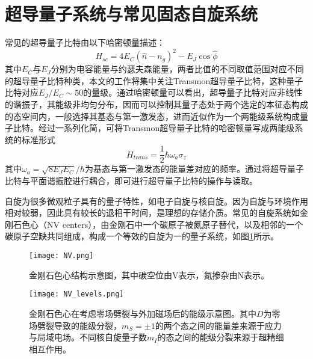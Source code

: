         \section{超导量子系统与常见固态自旋系统} %
        \label{sec:qubit_and_spin}

            常见的超导量子比特由以下哈密顿量描述：
            \begin{equation}
                H_{sc} = 4 E_C (\hat n - n_g)^2 -E_J \cos \hat \phi
            \end{equation}
            其中$ E_C $与$E_J$分别为电容能量与约瑟夫森能量，两者比值的不同取值范围对应不同的超导量子比特种类，本文的工作将集中关注Transmon超导量子比特，这种量子比特对应$E_J/E_C\sim 50$的量级\cite{koch2007charge}。通过哈密顿量可以看出，超导量子比特对应非线性的谐振子，其能级非均匀分布，因而可以控制其量子态处于两个选定的本征态构成的态空间内，一般选择其基态与第一激发态，进而近似作为一个两能级系统构成量子比特。经过一系列化简，可将Transmon超导量子比特的哈密顿量写成两能级系统的标准形式
            \begin{equation}
                H_{trans} = \frac{1}{2}\hbar \omega_a \sigma_z 
            \end{equation}
            其中$ \omega_a = \sqrt{8E_JE_C}/\hbar $为基态与第一激发态的能量差对应的频率。通过将超导量子比特与平面谐振腔进行耦合，即可进行超导量子比特的操作与读取。

            自旋为很多微观粒子具有的量子特性，如电子自旋与核自旋。因为自旋与环境作用相对较弱，因此具有较长的退相干时间，是理想的存储介质。常见的自旋系统如金刚石色心（NV centers），由金刚石中一个碳原子被氮原子替代，以及相邻的一个碳原子空缺共同组成，构成一个等效的自旋为一的量子系统，如图\ref{fig:NV_centers}所示。

            \begin{figure}[h]
                \centering
                \texttt{[image: NV.png]}
                \caption{金刚石色心结构示意图，其中碳空位由V表示，氮掺杂由N表示\cite{grezes2016towards}。}
                \label{fig:NV_centers}
            \end{figure}%

            \begin{figure}[h]
                \centering
                \texttt{[image: NV\_levels.png]}
                \caption{金刚石色心在考虑零场劈裂与外加磁场后的能级示意图。其中$D$为零场劈裂导致的能级分裂，$m_S = \pm1$的两个态之间的能量差来源于应力与局域电场。不同核自旋量子数$m_I$的态之间的能级分裂来源于超精细相互作用\cite{grezes2016towards}。}
                \label{fig:NV_levels}
            \end{figure}

